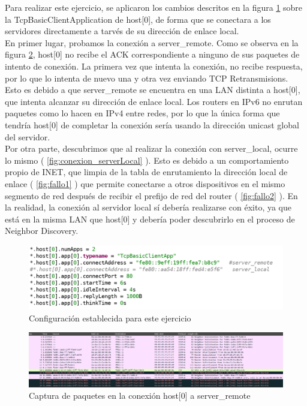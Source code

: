Para realizar este ejercicio, se aplicaron los cambios descritos en la figura \ref{fig:conf_linklocalTCP} sobre la TcpBasicClientApplication de host[0], de forma que se conectara a los servidores directamente a tarvés de su dirección de enlace local.\\
En primer lugar, probamos la conexión a server\_remote. Como se observa en la figura \ref{fig:conexion_serverRemote}, host[0] no recibe el ACK correspondiente a ninguno de sus paquetes de intento de conexión. La primera vez que intenta la conexión, no recibe respuesta, por lo que lo intenta de nuevo una y otra vez enviando TCP Retransmisions. Esto es debido a que server\_remote se encuentra en una LAN distinta a host[0], que intenta alcanzar su dirección de enlace local. Los routers en IPv6 no enrutan paquetes como lo hacen en IPv4 entre redes, por lo que la única forma que tendría host[0] de completar la conexión sería usando la dirección unicast global del servidor.\\
Por otra parte, descubrimos que al realizar la conexión con server\_local, ocurre lo mismo ( \ref{fig:conexion_serverLocal} ). Esto es debido a un comportamiento propio de INET, que limpia de la tabla de enrutamiento la dirección local de enlace ( \ref{fig:fallo1} ) que permite conectarse a otros dispositivos en el mismo segmento de red después de recibir el prefijo de red del router ( \ref{fig:fallo2} ). En la realidad, la conexión al servidor local sí debería realizarse con éxito, ya que está en la misma LAN que host[0] y debería poder descubrirlo en el proceso de Neighbor Discovery.

\begin{figure}[H]
    \centering
    \includegraphics[width=135mm, scale=0.75]{imaxes/ejercicio2_7_1.png}
    \caption{Configuración establecida para este ejercicio}
    \label{fig:conf_linklocalTCP}
\end{figure}

\begin{figure}[H]
    \centering
    \includegraphics[width=135mm, scale=0.75]{imaxes/ejercicio2_7_3.png}
    \caption{Captura de paquetes en la conexión host[0] a server\_remote}
    \label{fig:conexion_serverRemote}
\end{figure}


